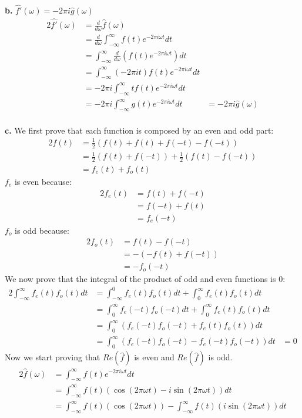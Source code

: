 \documentclass[12pt]{article}
\begin{document}
	\textbf{b.} $\hat{f'}(\omega) = - 2 \pi i \hat{g}(\omega)$
	\begin{alignat*}{2}
		\hat{f'}(\omega) &= \frac{d}{d\omega} \hat{f}(\omega)\\
		&= \frac{d}{d\omega} \int_{-\infty}^{\infty} f(t) e^{-2\pi i \omega t} dt\\
		&= \int_{-\infty}^{\infty} \frac{d}{d\omega} (f(t)e^{-2\pi i \omega t})  dt\\
		&= \int_{-\infty}^{\infty} (-2\pi i t) f(t)e^{-2\pi i \omega t}  dt\\
		&= -2\pi i \int_{-\infty}^{\infty} t f(t)e^{-2\pi i \omega t}  dt\\
		&= -2\pi i \int_{-\infty}^{\infty} g(t) e^{-2\pi i \omega t}  dt &= -2\pi i \hat{g}(\omega)
	\end{alignat*}\\
	\textbf{c.}
	We first prove that each function is composed by an even and odd part:
	\begin{alignat*}{2}
		f(t) &= \frac{1}{2} (f(t) + f(t) + f(-t) - f(-t))\\
		&= \frac{1}{2} (f(t) + f(-t)) + \frac{1}{2} (f(t) - f(-t))\\
		&= f_e(t) + f_o(t)
	\end{alignat*}
	$f_e$ is even because:
	\begin{alignat*}{2}
		f_e(t) &=  f(t) + f(-t)\\
		&= f(-t) + f(t)\\
		&= f_e(-t)
	\end{alignat*}
	$f_o$ is odd because:
	\begin{alignat*}{2}
		f_o(t) &=  f(t) - f(-t)\\
		&= - (-f(t) + f(-t))\\
		&= - f_o(-t)
	\end{alignat*}
	We now prove that the integral of the product of odd and even functions is 0:
	\begin{alignat*}{2}
		\int_{-\infty}^{\infty} f_e(t) f_o(t) dt &= \int_{-\infty}^{0} f_e(t) f_o(t) dt+ \int_{0}^{\infty} f_e(t) f_o(t) dt\\
		&= \int_{0}^{\infty} f_e(-t) f_o(-t) dt+ \int_{0}^{\infty} f_e(t) f_o(t) dt\\
		&= \int_{0}^{\infty} (f_e(-t) f_o(-t) + f_e(t) f_o(t)) dt\\
		&= \int_{0}^{\infty} (f_e(-t) f_o(-t) - f_e(-t) f_o(-t)) dt &= 0
	\end{alignat*}
	Now we start proving that $Re(\hat{f})$ is even and $Re(\hat{f})$ is odd.
	\begin{alignat*}{2}
	\hat{f}(\omega) &= \int_{-\infty}^{\infty} f(t) e^{-2\pi i \omega t} dt\\
	&= \int_{-\infty}^{\infty} f(t)(\cos(2\pi\omega t) - i \sin(2\pi\omega t)) dt\\
	&= \int_{-\infty}^{\infty} f(t)(\cos(2\pi\omega t) ) - \int_{-\infty}^{\infty} f(t)(i \sin(2\pi\omega t)) dt\\
	\end{alignat*}
\end{document}
